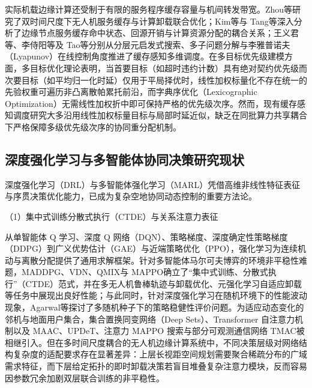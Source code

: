 实际机载边缘计算还受制于有限的服务程序缓存容量与机间转发带宽。Zhou等研究了双时间尺度下无人机服务缓存与计算卸载联合优化；Kim等与 Tang等深入分析了边缘节点服务缓存命中状态、回源开销与计算资源分配的耦合关系；王义君等、李侍阳等及 Tao等分别从分层元启发式搜索、多子问题分解与李雅普诺夫（Lyapunov）在线控制角度推进了缓存感知多维调度。在多目标优先级建模方面，多目标优化理论表明\cite{marler2004survey}，当首要目标（如超时违约计数）具有绝对契约优先级而次要目标（如平均归一化时延）仅用于平局择优时，线性加权标量化不存在统一的先验权重可遍历非凸离散帕累托前沿，而字典序优化（Lexicographic Optimization）无需线性加权折中即可保持严格的优先级次序。然而，现有缓存感知调度研究大多沿用线性加权标量目标与局部时延近似，缺乏在同批算力共享耦合下严格保障多级优先级次序的协同重分配机制。

\subsection{深度强化学习与多智能体协同决策研究现状}
\label{sec:ch1-drl-related}

深度强化学习（DRL）与多智能体强化学习（MARL）凭借高维非线性特征表征与序贯决策优化能力\cite{lecun2015deep,sutton2018reinforcement,busoniu2008comprehensive}，已成为复杂空地协同动态控制的重要方法论\cite{gronauer2022multi,oroojlooyjadid2022review,shakarami2024beyond,hady2025survey}。

（1）集中式训练分散式执行（CTDE）与关系注意力表征

从单智能体 Q 学习\cite{watkins1992q}、深度 Q 网络（DQN）\cite{mnih2015human}、策略梯度\cite{williams1992simple}、深度确定性策略梯度（DDPG）\cite{lillicrap2016continuous}到广义优势估计（GAE）与近端策略优化（PPO）\cite{schulman2015high,schulman2017proximal}，强化学习为连续机动与离散分配提供了通用求解框架。针对多智能体马尔可夫博弈\cite{littman1994markov}的环境非平稳性难题，MADDPG\cite{lowe2017multi}、VDN\cite{sunehag2018value}、QMIX\cite{rashid2018qmix}与 MAPPO\cite{yu2022surprising}确立了“集中式训练、分散式执行”（CTDE）范式，并在多无人机鲁棒轨迹与卸载优化\cite{li2024robust}、元强化学习自适应卸载\cite{hossain2024computation}等任务中展现出良好性能；与此同时，针对深度强化学习在随机环境下的性能波动现象，Agarwal等探讨了多随机种子下的策略稳健性评价问题。为适应动态变化的邻机与地面用户集合，集合置换同变网络（Deep Sets）\cite{zaheer2017deep}、Transformer 自注意力机制\cite{vaswani2017attention}以及 MAAC\cite{iqbal2019actor}、UPDeT\cite{hu2021updet}、注意力 MAPPO 搜索\cite{zhang2025as}与部分可观测通信网络 TMAC\cite{li2025tmac}被相继引入。但在多时间尺度耦合的无人机边缘计算系统中，不同决策层级对网络结构复杂度的适配要求存在显著差异：上层长视距空间规划需要聚合稀疏分布的广域需求特征，而下层给定拓扑的即时卸载决策若盲目堆叠复杂注意力模块，反而容易因参数冗余加剧双层联合训练的非平稳性。

